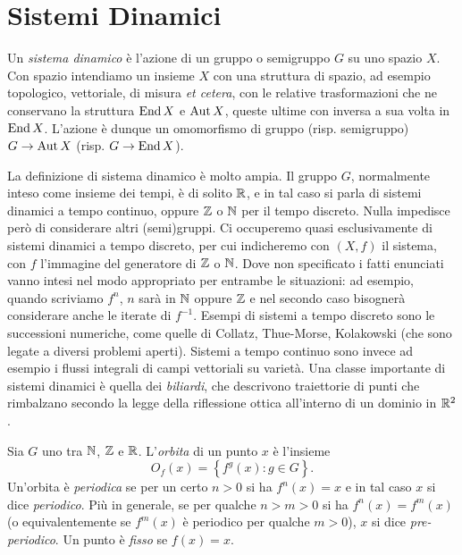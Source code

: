 \section{Sistemi Dinamici}

\begin{defi}
 Un \emph{sistema dinamico} è l'azione di un gruppo o semigruppo $G$ su uno spazio $X$. 
 Con spazio intendiamo un insieme $X$ con una struttura di spazio, ad esempio topologico, vettoriale, di misura 
 \emph{et cetera}, con le relative trasformazioni che ne conservano la struttura $\operatorname{End} X$ e $\operatorname{Aut} X$, 
 queste ultime con inversa a sua volta in $\operatorname{End} X$. L'azione è dunque un omomorfismo di gruppo (risp. semigruppo) $G\rightarrow \operatorname{Aut} X$ (risp. $G\rightarrow \operatorname{End} X$).
\end{defi}

La definizione di sistema dinamico è molto ampia. 
Il gruppo $G$, normalmente inteso come insieme dei tempi, è di solito $\mathbb{R}$, e in tal caso si parla di sistemi dinamici a tempo continuo, 
oppure $\mathbb{Z}$ o $\mathbb{N}$ per il tempo discreto. Nulla impedisce però di considerare altri (semi)gruppi. Ci occuperemo quasi esclusivamente di sistemi dinamici a tempo discreto, 
per cui indicheremo con $(X,f)$ il sistema, con $f$ l'immagine del generatore di $\mathbb{Z}$ o $\mathbb{N}$. 
Dove non specificato i fatti enunciati vanno intesi nel modo appropriato per entrambe le situazioni: 
ad esempio, quando scriviamo $f^n$, $n$ sarà in $\mathbb{N}$ oppure $\mathbb{Z}$ e nel secondo caso bisognerà considerare anche le iterate di $f^{-1}$. 
Esempi di sistemi a tempo discreto sono le successioni numeriche, come quelle di Collatz, Thue-Morse, Kolakowski (che sono legate a diversi problemi aperti).
Sistemi a tempo continuo sono invece ad esempio i flussi integrali di campi vettoriali
su varietà.
Una classe importante di sistemi dinamici è quella dei \emph{biliardi}, che descrivono traiettorie di punti che rimbalzano 
secondo la legge della riflessione ottica all'interno di un dominio in $\mathbb{R}^2$.

\begin{defi} Sia $G$ uno tra $\mathbb{N}$, $\mathbb{Z}$ e $\mathbb{R}$. L'\emph{orbita} di un punto $x$ è l'insieme 
\[O_f(x)=\left\{f^g(x): g\in G \right\}.\] 
Un'orbita è \emph{periodica} se per un certo $n>0$ si ha $f^n(x)=x$
e in tal caso $x$ si dice \emph{periodico}. Più in generale, se
per qualche $n>m>0$ si ha $f^n(x)=f^m(x)$ (o equivalentemente se $f^m(x)$ è periodico per qualche
$m>0$), $x$ si dice \emph{pre-periodico}. 
Un punto è \emph{fisso} se $f(x)=x$.\end{defi}

